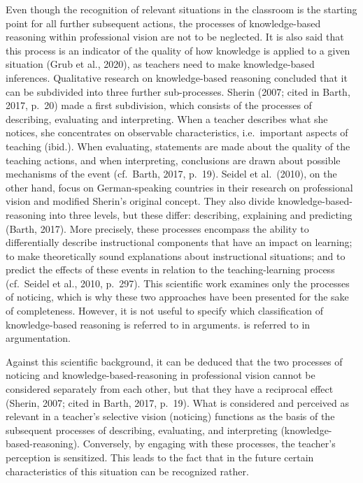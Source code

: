 \documentclass[
  man]{apa6}
\begin{document}
Even though the recognition of relevant situations in the classroom is the starting point for all further subsequent actions, the processes of knowledge-based reasoning within professional vision are not to be neglected. It is also said that this process is an indicator of the quality of how knowledge is applied to a given situation (Grub et al., 2020), as teachers need to make knowledge-based inferences. Qualitative research on knowledge-based reasoning concluded that it can be subdivided into three further sub-processes. Sherin (2007; cited in Barth, 2017, p.~20) made a first subdivision, which consists of the processes of describing, evaluating and interpreting. When a teacher describes what she notices, she concentrates on observable characteristics, i.e.~important aspects of teaching (ibid.). When evaluating, statements are made about the quality of the teaching actions, and when interpreting, conclusions are drawn about possible mechanisms of the event (cf.~Barth, 2017, p.~19). Seidel et al.~(2010), on the other hand, focus on German-speaking countries in their research on professional vision and modified Sherin's original concept. They also divide knowledge-based-reasoning into three levels, but these differ: describing, explaining and predicting (Barth, 2017). More precisely, these processes encompass the ability to differentially describe instructional components that have an impact on learning; to make theoretically sound explanations about instructional situations; and to predict the effects of these events in relation to the teaching-learning process (cf.~Seidel et al., 2010, p.~297). This scientific work examines only the processes of noticing, which is why these two approaches have been presented for the sake of completeness. However, it is not useful to specify which classification of knowledge-based reasoning is referred to in arguments. is referred to in argumentation.

Against this scientific background, it can be deduced that the two processes of noticing and knowledge-based-reasoning in professional vision cannot be considered separately from each other, but that they have a reciprocal effect (Sherin, 2007; cited in Barth, 2017, p.~19). What is considered and perceived as relevant in a teacher's selective vision (noticing) functions as the basis of the subsequent processes of describing, evaluating, and interpreting (knowledge-based-reasoning). Conversely, by engaging with these processes, the teacher's perception is sensitized. This leads to the fact that in the future certain characteristics of this situation can be recognized rather.
\end{document}
